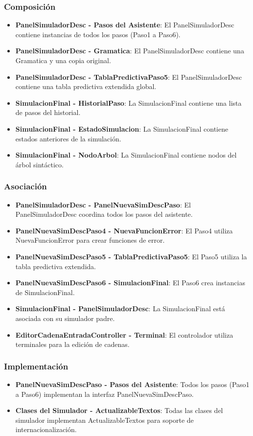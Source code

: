 \subsubsection{Composición}
\begin{itemize}
    \item \textbf{PanelSimuladorDesc - Pasos del Asistente}: El PanelSimuladorDesc contiene instancias de todos los pasos (Paso1 a Paso6).
    \item \textbf{PanelSimuladorDesc - Gramatica}: El PanelSimuladorDesc contiene una Gramatica y una copia original.
    \item \textbf{PanelSimuladorDesc - TablaPredictivaPaso5}: El PanelSimuladorDesc contiene una tabla predictiva extendida global.
    \item \textbf{SimulacionFinal - HistorialPaso}: La SimulacionFinal contiene una lista de pasos del historial.
    \item \textbf{SimulacionFinal - EstadoSimulacion}: La SimulacionFinal contiene estados anteriores de la simulación.
    \item \textbf{SimulacionFinal - NodoArbol}: La SimulacionFinal contiene nodos del árbol sintáctico.
\end{itemize}

\subsubsection{Asociación}
\begin{itemize}
    \item \textbf{PanelSimuladorDesc - PanelNuevaSimDescPaso}: El PanelSimuladorDesc coordina todos los pasos del asistente.
    \item \textbf{PanelNuevaSimDescPaso4 - NuevaFuncionError}: El Paso4 utiliza NuevaFuncionError para crear funciones de error.
    \item \textbf{PanelNuevaSimDescPaso5 - TablaPredictivaPaso5}: El Paso5 utiliza la tabla predictiva extendida.
    \item \textbf{PanelNuevaSimDescPaso6 - SimulacionFinal}: El Paso6 crea instancias de SimulacionFinal.
    \item \textbf{SimulacionFinal - PanelSimuladorDesc}: La SimulacionFinal está asociada con su simulador padre.
    \item \textbf{EditorCadenaEntradaController - Terminal}: El controlador utiliza terminales para la edición de cadenas.
\end{itemize}

\subsubsection{Implementación}
\begin{itemize}
    \item \textbf{PanelNuevaSimDescPaso - Pasos del Asistente}: Todos los pasos (Paso1 a Paso6) implementan la interfaz PanelNuevaSimDescPaso.
    \item \textbf{Clases del Simulador - ActualizableTextos}: Todas las clases del simulador implementan ActualizableTextos para soporte de internacionalización.
\end{itemize}

